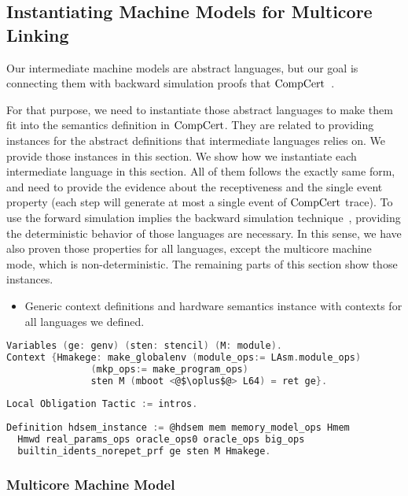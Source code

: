 
\subsection{Instantiating Machine Models for Multicore Linking}
\label{chapter:certikos:subsec:intermediate-machine-instantiation}

Our intermediate machine models are abstract languages, but 
our goal is connecting them with backward simulation proofs that $\mathrm{CompCert}$~\cite{leroy06}.

For that purpose, 
we need to instantiate those abstract languages to make them fit into 
the semantics definition in $\mathrm{CompCert}$.
They are related to
providing instances 
for the abstract definitions that intermediate languages relies on. 
We provide those instances in this section. 
We show how we instantiate each intermediate language 
in this section. All of them follows the exactly same form, 
and need to provide the evidence about the receptiveness and the single event property (each step will generate at most a single event of $\mathrm{CompCert}$ trace). 
To use the forward simulation implies the backward simulation technique~\cite{leroy06},
providing the deterministic behavior of those languages 
are necessary. 
In this sense, 
we have also proven those properties 
for all languages, except the multicore machine mode, which is non-deterministic. 
The remaining parts of this section 
show those instances.

\begin{itemize}[leftmargin=*]
\item Generic context definitions and hardware semantics instance with contexts for all languages we defined.
\end{itemize}
\begin{lstlisting}[language=C]
Variables (ge: genv) (sten: stencil) (M: module).
Context {Hmakege: make_globalenv (module_ops:= LAsm.module_ops)
               (mkp_ops:= make_program_ops) 
               sten M (mboot <@$\oplus$@> L64) = ret ge}.        
    
Local Obligation Tactic := intros.
    
Definition hdsem_instance := @hdsem mem memory_model_ops Hmem 
  Hmwd real_params_ops oracle_ops0 oracle_ops big_ops 
  builtin_idents_norepet_prf ge sten M Hmakege.    
\end{lstlisting}

\subsubsection{Multicore Machine Model}

